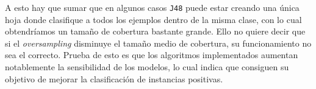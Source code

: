   A esto hay que sumar que en algunos casos \texttt{J48} puede estar creando una única hoja donde clasifique a todos los
  ejemplos dentro  de la misma clase, con lo cual obtendríamos un tamaño de cobertura bastante grande. Ello no quiere decir
  que si el \textit{oversampling} disminuye el tamaño medio de cobertura, su funcionamiento no sea el correcto. Prueba de esto
  es que los algoritmos implementados aumentan notablemente la sensibilidad de los modelos, lo cual indica que 
  consiguen su objetivo de mejorar la clasificación de instancias positivas.
 